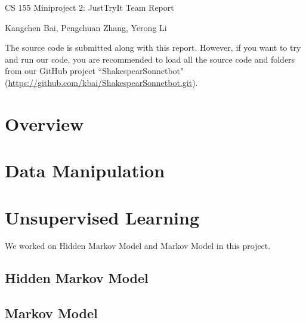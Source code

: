 





\pagestyle{fancy}

\LARGE
\begin{center}
CS 155 Miniproject 2: JustTryIt Team Report

\large
Kangchen Bai, Pengchuan Zhang, Yerong Li
\end{center}

\normalsize
\medskip

The source code is submitted along with this report. However, if you want to try and run our code, you are recommended to load all the source code and folders from our GitHub project ``ShakespearSonnetbot" (\url{https://github.com/kbai/ShakespearSonnetbot.git}).

\section{Overview}



\section{Data Manipulation}


\section{Unsupervised Learning}
We worked on Hidden Markov Model and Markov Model in this project.

\subsection{Hidden Markov Model}

\subsection{Markov Model}

%

